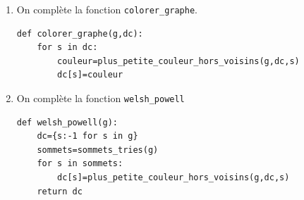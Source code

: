 \documentclass[11pt,a4paper]{article}
\newcommand{\mip}[1]{\texttt{#1}}
\begin{document}
\begin{enumerate}[resume]
\bigskip
De façon équivalente, on peut proposer le coloriage sous la forme de ce dictionnaire :

\mip{{'Elise':0,'Octavie':1,'Virgile':2,'Pierre':0,'Raphael':1,'Sixtine':0}}.
\item On complète la fonction \mip{colorer_graphe}.

\begin{verbatim}
def colorer_graphe(g,dc):
    for s in dc:
        couleur=plus_petite_couleur_hors_voisins(g,dc,s)
        dc[s]=couleur
\end{verbatim}

\item On complète la fonction \mip{welsh_powell}

\begin{verbatim}
def welsh_powell(g):
    dc={s:-1 for s in g}
    sommets=sommets_tries(g)
    for s in sommets:
        dc[s]=plus_petite_couleur_hors_voisins(g,dc,s)
    return dc
\end{verbatim}

\end{enumerate}
\end{document}
